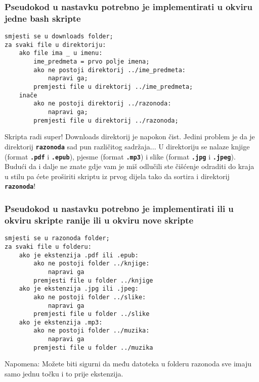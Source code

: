 \documentclass[12pt,a4paper]{article}
\newcommand{\shell}[1]{\texttt{\textbf{#1}}}
\begin{document}
    \subsubsection*{Pseudokod u nastavku potrebno je implementirati u okviru jedne
    bash skripte}
    \begin{verbatim}
smjesti se u downloads folder;
za svaki file u direktoriju:
    ako file ima _ u imenu:
        ime_predmeta = prvo polje imena;
        ako ne postoji direktorij ../ime_predmeta:
            napravi ga;
        premjesti file u direktorij ../ime_predmeta;
    inače
        ako ne postoji direktorij ../razonoda:
            napravi ga;
        premjesti file u direktorij ../razonoda;
    \end{verbatim}

    Skripta radi super! Downloads direktorij je napokon čist. Jedini problem
    je da je direktorij \shell{razonoda} sad pun različitog sadržaja... U
    direktoriju se nalaze knjige (format \shell{.pdf} i \shell{.epub}), pjesme
    (format \shell{.mp3}) i  slike (format \shell{.jpg} i \shell{.jpeg}).
    Budući da i dalje ne znate gdje vam je miš odlučili ste čišćenje odraditi
    do kraja u stilu pa ćete proširiti skriptu iz prvog dijela tako da sortira
    i direktorij \shell{razonoda}!

    \subsubsection*{Pseudokod u nastavku potrebno je implementirati ili u okviru
    skripte ranije ili u okviru nove skripte}
\begin{verbatim}
smjesti se u razonoda folder;
za svaki file u folderu:
    ako je ekstenzija .pdf ili .epub:
        ako ne postoji folder ../knjige:
            napravi ga
        premjesti file u folder ../knjige
    ako je ekstenzija .jpg ili .jpeg:
        ako ne postoji folder ../slike:
            napravi ga
        premjesti file u folder ../slike
    ako je ekstenzija .mp3:
        ako ne postoji folder ../muzika:
            napravi ga
        premjesti file u folder ../muzika
\end{verbatim}

    Napomena: Možete biti sigurni da među datoteka u folderu razonoda sve imaju samo
    jednu točku i to prije ekstenzija.
\end{document}
